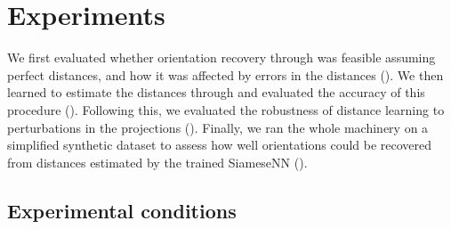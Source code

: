 \section{Experiments}\label{sec:experiments}


We first evaluated whether orientation recovery through  was feasible assuming perfect distances, and how it was affected by errors in the distances ().
We then learned to estimate the distances through  and evaluated the accuracy of this procedure ().
Following this, we evaluated the robustness of distance learning to perturbations in the projections ().
Finally, we ran the whole machinery on a simplified synthetic dataset to assess how well orientations could be recovered from distances estimated by the trained SiameseNN ().


\subsection{Experimental conditions}\label{sec:results:data}

